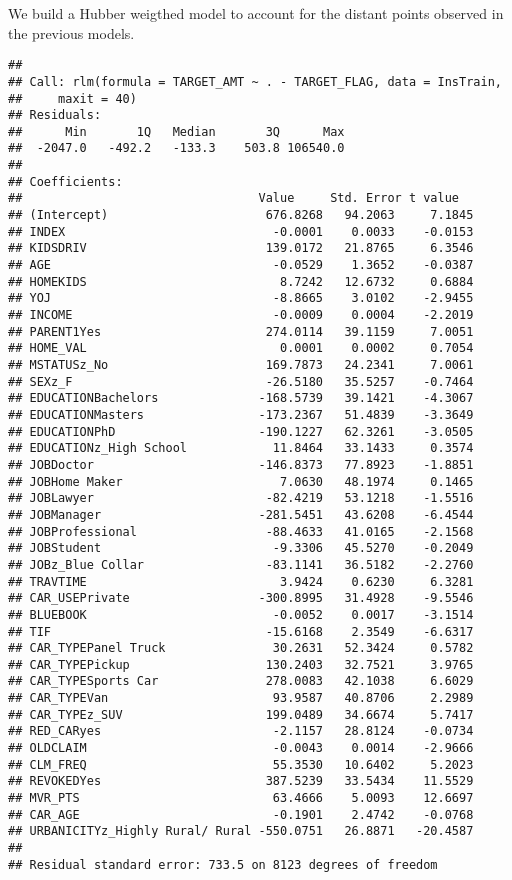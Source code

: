 \documentclass[]{article}
\begin{document}
We build a Hubber weigthed model to account for the distant points
observed in the previous models.

\begin{verbatim}
## 
## Call: rlm(formula = TARGET_AMT ~ . - TARGET_FLAG, data = InsTrain, 
##     maxit = 40)
## Residuals:
##      Min       1Q   Median       3Q      Max 
##  -2047.0   -492.2   -133.3    503.8 106540.0 
## 
## Coefficients:
##                                 Value     Std. Error t value  
## (Intercept)                      676.8268   94.2063     7.1845
## INDEX                             -0.0001    0.0033    -0.0153
## KIDSDRIV                         139.0172   21.8765     6.3546
## AGE                               -0.0529    1.3652    -0.0387
## HOMEKIDS                           8.7242   12.6732     0.6884
## YOJ                               -8.8665    3.0102    -2.9455
## INCOME                            -0.0009    0.0004    -2.2019
## PARENT1Yes                       274.0114   39.1159     7.0051
## HOME_VAL                           0.0001    0.0002     0.7054
## MSTATUSz_No                      169.7873   24.2341     7.0061
## SEXz_F                           -26.5180   35.5257    -0.7464
## EDUCATIONBachelors              -168.5739   39.1421    -4.3067
## EDUCATIONMasters                -173.2367   51.4839    -3.3649
## EDUCATIONPhD                    -190.1227   62.3261    -3.0505
## EDUCATIONz_High School            11.8464   33.1433     0.3574
## JOBDoctor                       -146.8373   77.8923    -1.8851
## JOBHome Maker                      7.0630   48.1974     0.1465
## JOBLawyer                        -82.4219   53.1218    -1.5516
## JOBManager                      -281.5451   43.6208    -6.4544
## JOBProfessional                  -88.4633   41.0165    -2.1568
## JOBStudent                        -9.3306   45.5270    -0.2049
## JOBz_Blue Collar                 -83.1141   36.5182    -2.2760
## TRAVTIME                           3.9424    0.6230     6.3281
## CAR_USEPrivate                  -300.8995   31.4928    -9.5546
## BLUEBOOK                          -0.0052    0.0017    -3.1514
## TIF                              -15.6168    2.3549    -6.6317
## CAR_TYPEPanel Truck               30.2631   52.3424     0.5782
## CAR_TYPEPickup                   130.2403   32.7521     3.9765
## CAR_TYPESports Car               278.0083   42.1038     6.6029
## CAR_TYPEVan                       93.9587   40.8706     2.2989
## CAR_TYPEz_SUV                    199.0489   34.6674     5.7417
## RED_CARyes                        -2.1157   28.8124    -0.0734
## OLDCLAIM                          -0.0043    0.0014    -2.9666
## CLM_FREQ                          55.3530   10.6402     5.2023
## REVOKEDYes                       387.5239   33.5434    11.5529
## MVR_PTS                           63.4666    5.0093    12.6697
## CAR_AGE                           -0.1901    2.4742    -0.0768
## URBANICITYz_Highly Rural/ Rural -550.0751   26.8871   -20.4587
## 
## Residual standard error: 733.5 on 8123 degrees of freedom
\end{verbatim}
\end{document}
